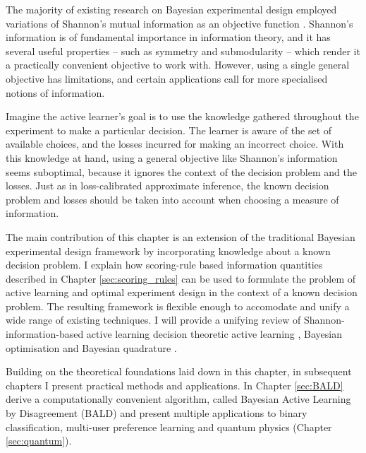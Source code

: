 \cbstart
The majority of existing research on Bayesian experimental design employed variations of Shannon's mutual information as an objective function \citep{Lindley56,jaynes1957,MacKay1992,Krause2006,Houlsby2011}. Shannon's information is of fundamental importance in information theory, and it has several useful properties -- such as symmetry and submodularity \citep{Krause2006} -- which render it a practically convenient objective to work with. However, using a single general objective has limitations, and certain applications call for more specialised notions of information.

Imagine the active learner's goal is to use the knowledge gathered throughout the experiment to make a particular decision. The learner is aware of the set of available choices, and the losses incurred for making an incorrect choice. With this knowledge at hand, using a general objective like Shannon's information seems suboptimal, because it ignores the context of the decision problem and the losses. Just as in loss-calibrated approximate inference, the known decision problem and losses should be taken into account when choosing a measure of information.

The main contribution of this chapter is an extension of the traditional Bayesian experimental design framework by incorporating knowledge about a known decision problem. I explain how scoring-rule based information quantities described in Chapter \ref{sec:scoring_rules} can be used to formulate the problem of active learning and optimal experiment design in the context of a known decision problem. The resulting framework is flexible enough to accomodate and unify a wide range of existing techniques.
\cbend
I will provide a unifying review of Shannon-information-based active learning \citep{Lindley56,Krause2006,MacKay1992,Houlsby2011} decision theoretic active learning \citep{Kapoor2007,Zhu2003active}, Bayesian optimisation \citep{Hennig2012entropy,Hennig2012newton} and Bayesian quadrature \citep{BZHermiteQuadrature,BZMonteCarlo}.


Building on the theoretical foundations laid down in this chapter, in subsequent chapters I present practical methods and applications. In Chapter \ref{sec:BALD} derive a computationally convenient algorithm, called Bayesian Active Learning by Disagreement (BALD) and present multiple applications to binary classification, multi-user preference learning and quantum physics (Chapter \ref{sec:quantum}).

                                                      
